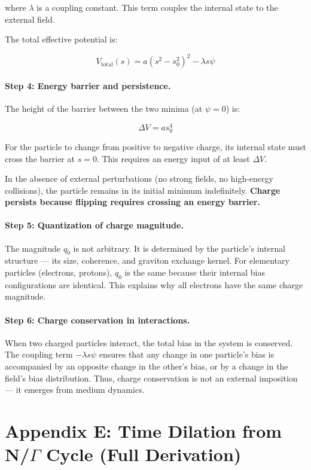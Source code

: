 \documentclass[12pt, a4paper]{article}
\begin{document}
where \( \lambda \) is a coupling constant. This term couples the internal state to the external field.

The total effective potential is:

\[
V_{\text{total}}(s) = a(s^2 - s_0^2)^2 - \lambda s \psi
\]

\paragraph{Step 4: Energy barrier and persistence.}

The height of the barrier between the two minima (at \( \psi = 0 \)) is:

\[
\Delta V = a s_0^4
\]

For the particle to change from positive to negative charge, its internal state must cross the barrier at \( s = 0 \). This requires an energy input of at least \( \Delta V \).

In the absence of external perturbations (no strong fields, no high-energy collisions), the particle remains in its initial minimum indefinitely. \textbf{Charge persists because flipping requires crossing an energy barrier.}

\paragraph{Step 5: Quantization of charge magnitude.}

The magnitude \( q_0 \) is not arbitrary. It is determined by the particle's internal structure — its size, coherence, and graviton exchange kernel. For elementary particles (electrons, protons), \( q_0 \) is the same because their internal bias configurations are identical. This explains why all electrons have the same charge magnitude.

\paragraph{Step 6: Charge conservation in interactions.}

When two charged particles interact, the total bias in the system is conserved. The coupling term \( -\lambda s \psi \) ensures that any change in one particle's bias is accompanied by an opposite change in the other's bias, or by a change in the field's bias distribution. Thus, charge conservation is not an external imposition — it emerges from medium dynamics.

\section{Appendix E: Time Dilation from N/\(\Gamma\) Cycle (Full Derivation)}
\label{app:G}
\end{document}
